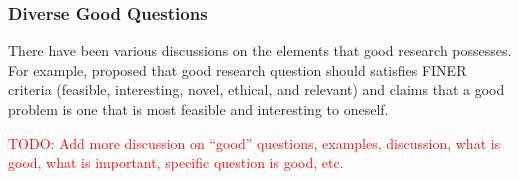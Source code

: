 
\subsubsection{Diverse Good Questions}
There have been various discussions on the elements that good research possesses. For example, \cite{hulley2007designing} proposed that good research question should satisfies FINER criteria (feasible, interesting, novel, ethical, and relevant) and \cite{alon2009choose} claims that a good problem is one that is most feasible and interesting to oneself.

\textcolor{red}{TODO: Add more discussion on ``good'' questions, examples, discussion, what is good, what is important, specific question is good, etc.}





